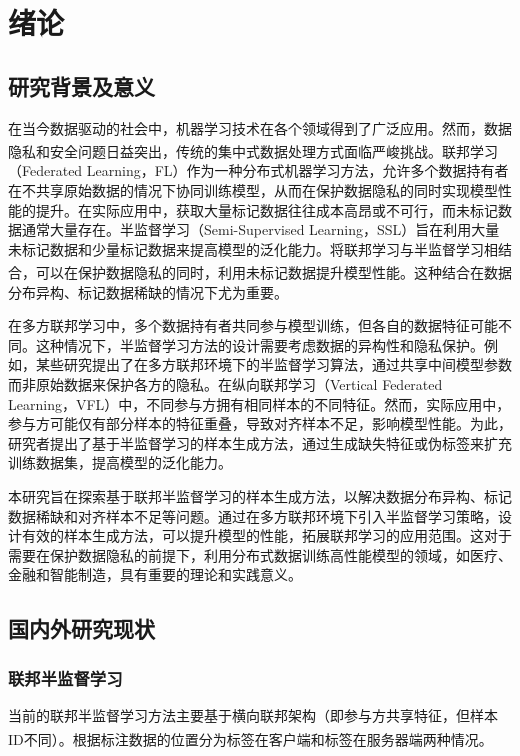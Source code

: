 \chapter{绪论} 
\thispagestyle{others} 
\pagestyle{others} 
\xiaosi 

\section{研究背景及意义}
在当今数据驱动的社会中，机器学习技术在各个领域得到了广泛应用。然而，数据隐私和安全问题日益突出，传统的集中式数据处理方式面临严峻挑战\textsuperscript{\cite{chen2021secureboost+,de2010practical}}。联邦学习（Federated Learning，FL）作为一种分布式机器学习方法，允许多个数据持有者在不共享原始数据的情况下协同训练模型，从而在保护数据隐私的同时实现模型性能的提升。在实际应用中，获取大量标记数据往往成本高昂或不可行，而未标记数据通常大量存在。半监督学习（Semi-Supervised Learning，SSL）旨在利用大量未标记数据和少量标记数据来提高模型的泛化能力。将联邦学习与半监督学习相结合，可以在保护数据隐私的同时，利用未标记数据提升模型性能\textsuperscript{\cite{li2021comatch}}。这种结合在数据分布异构、标记数据稀缺的情况下尤为重要。

在多方联邦学习中，多个数据持有者共同参与模型训练，但各自的数据特征可能不同。这种情况下，半监督学习方法的设计需要考虑数据的异构性和隐私保护。例如，某些研究提出了在多方联邦环境下的半监督学习算法，通过共享中间模型参数而非原始数据来保护各方的隐私。在纵向联邦学习（Vertical Federated Learning，VFL）中，不同参与方拥有相同样本的不同特征。然而，实际应用中，参与方可能仅有部分样本的特征重叠，导致对齐样本不足，影响模型性能。为此，研究者提出了基于半监督学习的样本生成方法，通过生成缺失特征或伪标签来扩充训练数据集，提高模型的泛化能力。

本研究旨在探索基于联邦半监督学习的样本生成方法，以解决数据分布异构、标记数据稀缺和对齐样本不足等问题。通过在多方联邦环境下引入半监督学习策略，设计有效的样本生成方法，可以提升模型的性能，拓展联邦学习的应用范围。这对于需要在保护数据隐私的前提下，利用分布式数据训练高性能模型的领域，如医疗、金融和智能制造，具有重要的理论和实践意义。

\section{国内外研究现状}
\subsection{联邦半监督学习}
当前的联邦半监督学习方法主要基于横向联邦架构（即参与方共享特征，但样本ID不同）。根据标注数据的位置分为标签在客户端和标签在服务器端两种情况\textsuperscript{\cite{jin2023federated}}。

